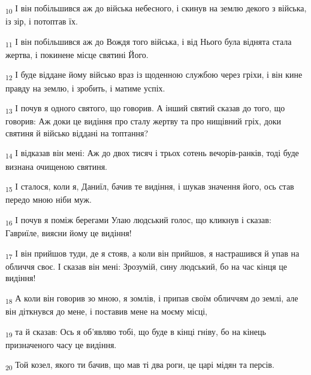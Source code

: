 \begin{tcolorbox}
\textsubscript{10} І він побільшився аж до війська небесного, і скинув на землю декого з війська, із зір, і потоптав їх.
\end{tcolorbox}
\begin{tcolorbox}
\textsubscript{11} І він побільшився аж до Вождя того війська, і від Нього була віднята стала жертва, і покинене місце святині Його.
\end{tcolorbox}
\begin{tcolorbox}
\textsubscript{12} І буде віддане йому військо враз із щоденною службою через гріхи, і він кине правду на землю, і зробить, і матиме успіх.
\end{tcolorbox}
\begin{tcolorbox}
\textsubscript{13} І почув я одного святого, що говорив. А інший святий сказав до того, що говорив: Аж доки це видіння про сталу жертву та про нищівний гріх, доки святиня й військо віддані на топтання?
\end{tcolorbox}
\begin{tcolorbox}
\textsubscript{14} І відказав він мені: Аж до двох тисяч і трьох сотень вечорів-ранків, тоді буде визнана очищеною святиня.
\end{tcolorbox}
\begin{tcolorbox}
\textsubscript{15} І сталося, коли я, Даниїл, бачив те видіння, і шукав значення його, ось став передо мною ніби муж.
\end{tcolorbox}
\begin{tcolorbox}
\textsubscript{16} І почув я поміж берегами Улаю людський голос, що кликнув і сказав: Гавриїле, виясни йому це видіння!
\end{tcolorbox}
\begin{tcolorbox}
\textsubscript{17} І він прийшов туди, де я стояв, а коли він прийшов, я настрашився й упав на обличчя своє. І сказав він мені: Зрозумій, сину людський, бо на час кінця це видіння!
\end{tcolorbox}
\begin{tcolorbox}
\textsubscript{18} А коли він говорив зо мною, я зомлів, і припав своїм обличчям до землі, але він діткнувся до мене, і поставив мене на моєму місці,
\end{tcolorbox}
\begin{tcolorbox}
\textsubscript{19} та й сказав: Ось я об'являю тобі, що буде в кінці гніву, бо на кінець призначеного часу це видіння.
\end{tcolorbox}
\begin{tcolorbox}
\textsubscript{20} Той козел, якого ти бачив, що мав ті два роги, це царі мідян та персів.
\end{tcolorbox}
